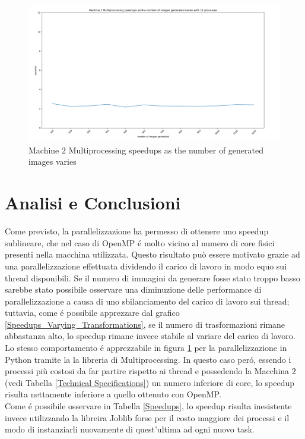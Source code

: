 \documentclass{article}
\begin{document}
\newpage

\begin{center}

\begin{figure}[!h]
\centering
\includegraphics[width= 13cm]{"Immagini/Speedup_Varying_Transformations_Multiprocessing.PNG"}
\caption{Machine $ 2 $ Multiprocessing speedups as the number of generated images varies}
\label{Speedups_Varying_Transformations_Multiprocessing}
\end{figure}

\end{center}


\section{Analisi e Conclusioni}

Come previsto, la parallelizzazione ha permesso di ottenere uno speedup sublineare, che nel caso di OpenMP \'e molto vicino al numero di core fisici presenti nella macchina utilizzata. Questo risultato può essere motivato grazie ad una parallelizzazione effettuata dividendo il carico di lavoro in modo equo sui thread disponibili. Se il numero di immagini da generare fosse stato troppo basso sarebbe stato possibile osservare una diminuzione delle performance di parallelizzazione a causa di uno sbilanciamento del carico di lavoro sui thread; tuttavia, come \'e possibile apprezzare dal grafico \ref{Speedups_Varying_Transformations}, se il numero di trasformazioni rimane abbastanza alto, lo speedup rimane invece stabile al variare del carico di lavoro.\\
Lo stesso comportamento \'e apprezzabile in figura \ref{Speedups_Varying_Transformations_Multiprocessing} per la parallelizzazione in Python tramite la la libreria di Multiprocessing. In questo caso per\'o, essendo i processi più costosi da far partire rispetto ai thread e possedendo la Macchina $ 2 $ (vedi Tabella \ref{Technical Specifications}) un numero inferiore di core, lo speedup risulta nettamente inferiore a quello ottenuto con OpenMP.\\
Come \'e possibile osservare in Tabella \ref{Speedups}, lo speedup risulta inesistente invece utilizzando la libreira Joblib forse per il costo maggiore dei processi e il modo di instanziarli nuovamente di quest'ultima ad ogni nuovo task.
\end{document}
